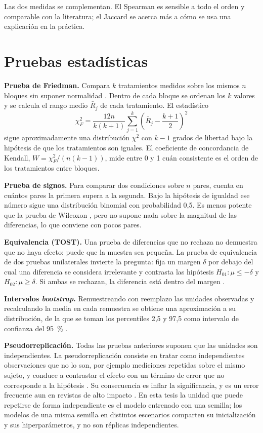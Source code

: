 Las dos medidas se complementan. El Spearman es sensible a todo el orden y comparable con la
literatura; el Jaccard se acerca más a cómo se usa una explicación en la práctica.

\section{Pruebas estadísticas}\label{sec:pruebas}

\textbf{Prueba de Friedman.} Compara $k$ tratamientos medidos sobre los mismos $n$ bloques sin
suponer normalidad \cite{Friedman1937}. Dentro de cada bloque se ordenan los $k$ valores y se
calcula el rango medio $\bar{R}_j$ de cada tratamiento. El estadístico
\begin{equation}
  \chi^2_F = \frac{12 n}{k(k+1)} \sum_{j=1}^{k} \left(\bar{R}_j - \frac{k+1}{2}\right)^2
\end{equation}
sigue aproximadamente una distribución $\chi^2$ con $k - 1$ grados de libertad bajo la hipótesis
de que los tratamientos son iguales. El coeficiente de concordancia de Kendall,
$W = \chi^2_F / (n(k-1))$, mide entre 0 y 1 cuán consistente es el orden de los tratamientos
entre bloques.

\textbf{Prueba de signos.} Para comparar dos condiciones sobre $n$ pares, cuenta en cuántos
pares la primera supera a la segunda. Bajo la hipótesis de igualdad ese número sigue una
distribución binomial con probabilidad 0,5. Es menos potente que la prueba de Wilcoxon
\cite{Wilcoxon1945}, pero no supone nada sobre la magnitud de las diferencias, lo que conviene
con pocos pares.

\textbf{Equivalencia (TOST).} Una prueba de diferencias que no rechaza no demuestra que no haya
efecto: puede que la muestra sea pequeña. La prueba de equivalencia de dos pruebas unilaterales
invierte la pregunta: fija un margen $\delta$ por debajo del cual una diferencia se considera
irrelevante y contrasta las hipótesis $H_{01}: \mu \leq -\delta$ y $H_{02}: \mu \geq \delta$.
Si ambas se rechazan, la diferencia está dentro del margen \cite{Lakens2017TOST}.

\textbf{Intervalos \textit{bootstrap}.} Remuestreando con reemplazo las unidades observadas y
recalculando la media en cada remuestra se obtiene una aproximación a su distribución, de la que
se toman los percentiles 2,5 y 97,5 como intervalo de confianza del 95~\% \cite{Efron1979Bootstrap}.

\textbf{Pseudorreplicación.} Todas las pruebas anteriores suponen que las unidades son
independientes. La pseudorreplicación consiste en tratar como independientes observaciones que
no lo son, por ejemplo mediciones repetidas sobre el mismo sujeto, y conduce a contrastar el
efecto con un término de error que no corresponde a la hipótesis \cite{Hurlbert1984}. Su
consecuencia es inflar la significancia, y es un error frecuente aun en revistas de alto impacto
\cite{Lazic2010}. En esta tesis la unidad que puede repetirse de forma independiente es el
modelo entrenado con una semilla; los modelos de una misma semilla en distintos escenarios
comparten su inicialización y sus hiperparámetros, y no son réplicas independientes.
